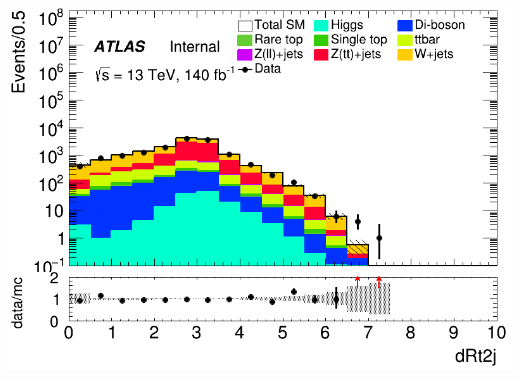 \documentclass[usenames,dvipsnames]{beamer}
\begin{document}
\begin{frame}
\begin{minipage}{0.32\textwidth}
        \includegraphics[width=\textwidth]{graphics/HH_met/HH_met_dRt2j.png}
    \end{minipage}
    
    \vspace{0.5cm} %


\end{frame}
\end{document}
